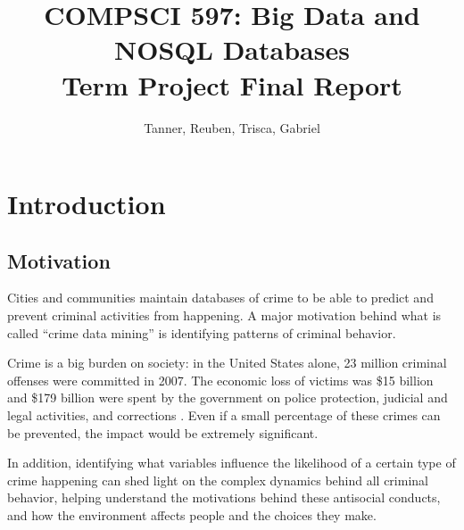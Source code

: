 \documentclass[a4paper,10pt]{article}
\title{{\large{COMPSCI 597: Big Data and NOSQL Databases}}\\Term Project Final Report}
\author{Tanner, Reuben, Trisca, Gabriel}
\begin{document}
\maketitle

\tableofcontents

\section{Introduction}
\subsection{Motivation}
Cities and communities maintain databases of crime to be able to predict and prevent criminal activities from happening. A major motivation behind what is called “crime data mining” \cite{Blockeel2013} is identifying patterns of criminal behavior\cite{Chen2004}. 

Crime is a big burden on society: in the United States alone, 23 million criminal offenses were committed in 2007. The economic loss of victims was \$15 billion and \$179 billion were spent by the government on police protection, judicial and legal activities, and corrections \cite{Justice2008}. Even if a small percentage of these crimes can be prevented, the impact would be extremely significant\cite{Syam2006}.

In addition, identifying what variables influence the likelihood of a certain type of crime happening can shed light on the complex dynamics behind all criminal behavior, helping understand the motivations behind these antisocial conducts, and how the environment affects people and the choices they make\cite{BUSS2012}.
\end{document}
